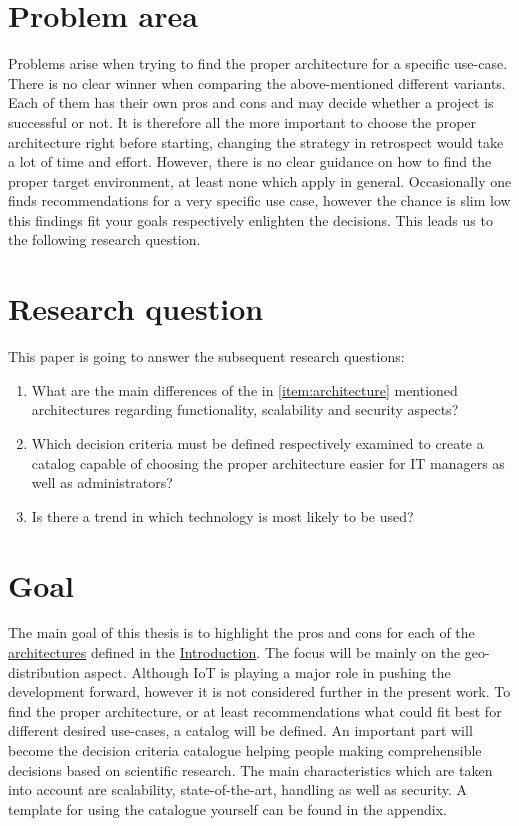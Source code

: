 \documentclass[MSC,Master,english]{twbook}%
\begin{document}
\section{Problem area}
Problems arise when trying to find the proper architecture for a specific use-case. There is no clear winner when comparing the above-mentioned different variants. Each of them  has their own pros and cons and may decide whether a project is successful or not. It is therefore all the more important to choose the proper architecture right before starting, changing the strategy in retrospect would take a lot of time and effort. However, there is no clear guidance on how to find the proper target environment, at least none which apply in general. Occasionally one finds recommendations for a very specific use case, however the chance is slim low this findings fit your goals respectively enlighten the decisions. This leads us to the following research question.

\section{Research question}
\label{sec:rq}
This paper is going to answer the subsequent research questions:
\begin{enumerate}
    \item What are the main differences of the in \autoref{item:architecture} mentioned architectures regarding functionality, scalability and security aspects?
    \item Which decision criteria must be defined respectively examined to create a catalog capable
    of choosing the proper architecture easier for \ac{IT} managers as well as administrators?
    \item Is there a trend in which technology is most likely to be used?
\end{enumerate}

\section{Goal}
\label{sec:goal}
The main goal of this thesis is to highlight the pros and cons for each of the \hyperref[item:architecture]{architectures} defined in the \hyperref[chap:introduction]{Introduction}. The focus will be mainly on the geo-distribution aspect. Although \ac{IoT} is playing a major role in pushing the development forward, however it is not considered further in the present work. To find the proper architecture, or at least recommendations what could fit best for different desired use-cases, a catalog will be defined. An important part will become the decision criteria catalogue helping people making comprehensible decisions based on scientific research. The main characteristics which are taken into account are scalability, state-of-the-art, handling as well as security. A template for using the catalogue yourself can be found in the appendix.
\end{document}
